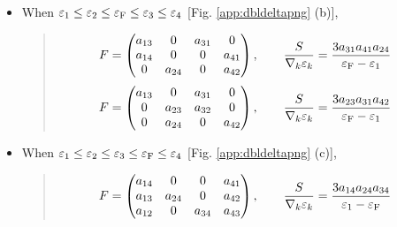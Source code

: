 \documentclass[letterpaper,10pt,dvipdfmx,openany]{sphinxmanual}
\begin{document}
\begin{itemize}
\item {} 
\sphinxAtStartPar
When \(\varepsilon_1 \leq \varepsilon_2 \leq \varepsilon_{\rm F} \leq \varepsilon_3 \leq\varepsilon_4\)
{[}Fig. \ref{app:dbldeltapng} (b){]},
\begin{quote}
\begin{equation*}
\begin{split}\begin{align}
F &=
\begin{pmatrix}
a_{1 3} &       0 & a_{3 1} & 0 \\
a_{1 4} &       0 &       0 & a_{4 1} \\
0 & a_{2 4} &       0 & a_{4 2}
\end{pmatrix},
\qquad
\frac{S}{\nabla_k \varepsilon_k} = \frac{3 a_{3 1} a_{4 1} a_{2 4}}{\varepsilon_{\rm F} - \varepsilon_1}
\end{align}\end{split}
\end{equation*}\begin{equation*}
\begin{split}\begin{align}
F &=
\begin{pmatrix}
a_{1 3} &       0 & a_{3 1} & 0 \\
0 & a_{2 3} & a_{3 2} & 0 \\
0 & a_{2 4} &       0 & a_{4 2}
\end{pmatrix},
\qquad
\frac{S}{\nabla_k \varepsilon_k} = \frac{3 a_{2 3} a_{3 1} a_{4 2}}{\varepsilon_{\rm F} - \varepsilon_1}
\end{align}\end{split}
\end{equation*}\end{quote}

\item {} 
\sphinxAtStartPar
When \(\varepsilon_1 \leq \varepsilon_2 \leq \varepsilon_3 \leq \varepsilon_{\rm F} \leq \varepsilon_4\)
{[}Fig. \ref{app:dbldeltapng} (c){]},
\begin{quote}
\begin{equation*}
\begin{split}\begin{align}
F &=
\begin{pmatrix}
a_{1 4} &       0 &       0 & a_{4 1} \\
a_{1 3} & a_{2 4} &       0 & a_{4 2} \\
a_{1 2} &       0 & a_{3 4} & a_{4 3}
\end{pmatrix},
\qquad
\frac{S}{\nabla_k \varepsilon_k} = \frac{3 a_{1 4} a_{2 4} a_{3 4}}{\varepsilon_1 - \varepsilon_{\rm F}}
\end{align}\end{split}
\end{equation*}\end{quote}

\end{itemize}
\end{document}
